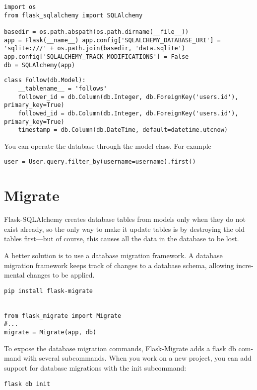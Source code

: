 \begin{lstlisting}[caption={database configuration},label={lst:1}]
import os
from flask_sqlalchemy import SQLAlchemy

basedir = os.path.abspath(os.path.dirname(__file__))
app = Flask(__name__) app.config['SQLALCHEMY_DATABASE_URI'] = 'sqlite:///' + os.path.join(basedir, 'data.sqlite')
app.config['SQLALCHEMY_TRACK_MODIFICATIONS'] = False
db = SQLAlchemy(app)

\end{lstlisting}

\begin{lstlisting}[caption={Model definition}]
class Follow(db.Model):
    __tablename__ = 'follows'
    follower_id = db.Column(db.Integer, db.ForeignKey('users.id'), primary_key=True)
    followed_id = db.Column(db.Integer, db.ForeignKey('users.id'), primary_key=True)
    timestamp = db.Column(db.DateTime, default=datetime.utcnow)

\end{lstlisting}

You can operate the database through the model class.
For example
\begin{lstlisting}
user = User.query.filter_by(username=username).first()
\end{lstlisting}


\section{Migrate}
\label{sec:migrate}

Flask-SQLAlchemy creates database tables from models only when they do not exist already, so the only way to make it update tables is by destroying the old tables first—but of course, this causes all the data in the database to be lost.

A better solution is to use a database migration framework.
A database migration framework keeps track of changes to a database schema, allowing incre‐ mental changes to be applied.


\begin{lstlisting}
pip install flask-migrate


from flask_migrate import Migrate
#...
migrate = Migrate(app, db)
\end{lstlisting}


To expose the database migration commands, Flask-Migrate adds a flask db com‐ mand with several subcommands. When you work on a new project, you can add support for database migrations with the init subcommand:
\begin{lstlisting}
flask db init
\end{lstlisting}

